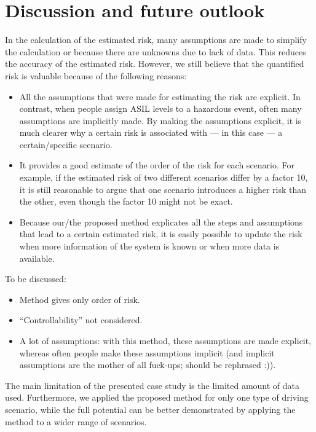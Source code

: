 \section{Discussion and future outlook} %
\label{sec:discussion}

In the calculation of the estimated risk, many assumptions are made to simplify the calculation or because there are unknowns due to lack of data. This reduces the accuracy of the estimated risk. 
However, we still believe that the quantified risk is valuable because of the following reasons:
\begin{itemize}
	\item All the assumptions that were made for estimating the risk are explicit. In contrast, when people assign ASIL levels to a hazardous event, often many assumptions are implicitly made. By making the assumptions explicit, it is much clearer why a certain risk is associated with --- in this case --- a certain/specific scenario.
	\item It provides a good estimate of the order of the risk for each scenario. For example, if the estimated risk of two different scenarios differ by a factor 10, it is still reasonable to argue that one scenario introduces a higher risk than the other, even though the factor 10 might not be exact.
	\item Because our/the proposed method explicates all the steps and assumptions that lead to a certain estimated risk, it is easily possible to update the risk when more information of the system is known or when more data is available.
\end{itemize}

To be discussed:
\begin{itemize}
	\item Method gives only order of risk.
	\item ``Controllability'' not considered.
	\item A lot of assumptions: with this method, these assumptions are made explicit, whereas often people make these assumptions implicit (and implicit assumptions are the mother of all fuck-ups; should be rephrased :)).
\end{itemize}


The main limitation of the presented case study is the limited amount of data used. Furthermore, we applied the proposed method for only one type of driving scenario, while the full potential can be better demonstrated by applying the method to a wider range of scenarios.